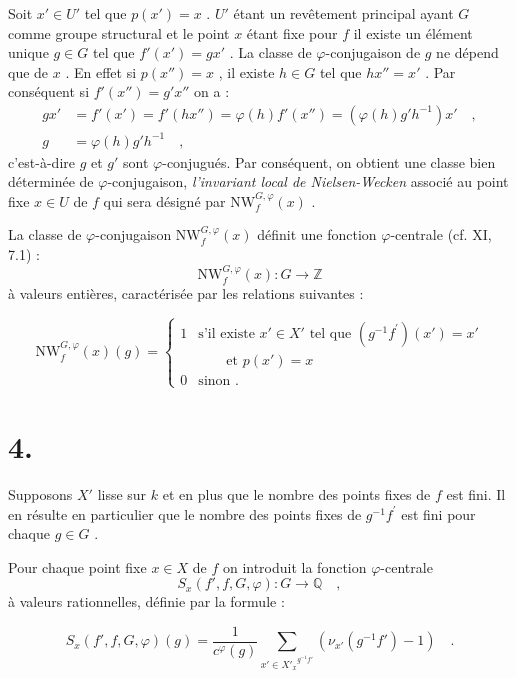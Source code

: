 \documentclass[11pt]{article}
\providecommand{\bZ}{\mathbb Z}
\providecommand{\bQ}{\mathbb Q}
\begin{document}
Soit $x' \in U'$ tel que $p(x') = x$ . $U'$ étant un revêtement principal ayant $G$ comme groupe structural et le point $x$ étant fixe pour $f$ il existe un élément unique $g \in G$ tel que $f'(x') = gx'$ . La classe de $\varphi$-conjugaison de $g$ ne dépend que de $x$ . En effet si $p(x'') = x$ , il existe $h \in G$ tel que $hx'' = x'$ . Par conséquent si $f'(x'') = g'x''$ on a :
\begin{align*}
gx' &= f'(x') = f'(hx'') = \varphi(h)f'(x'') = (\varphi(h)g'h^{-1})x' \quad , \\
g &= \varphi(h)g'h^{-1} \quad ,
\end{align*}
c'est-à-dire $g$ et $g'$ sont $\varphi$-conjugués. Par conséquent, on obtient une classe bien déterminée de $\varphi$-conjugaison, \emph{l'invariant local de Nielsen-Wecken} associé au point fixe $x \in U$ de $f$ qui sera désigné par $\mathrm{NW}_{f}^{G,\varphi}(x)$ .

La classe de $\varphi$-conjugaison $\mathrm{NW}_{f}^{G,\varphi}(x)$ définit une fonction $\varphi$-centrale (cf. XI, 7.1) :
\[
\mathrm{NW}_{f}^{G,\varphi}(x) : G \longrightarrow \bZ
\]
à valeurs entières, caractérisée par les relations suivantes :

\begin{equation}\tag{3.1}
\mathrm{NW}_{f}^{G,\varphi}(x)(g) = \begin{cases} 1 &
\text{s'il existe } x' \in X' \text{ tel que } (g^{-1}f^{\prime})(x') = x' \\ & \qquad \text{et } p(x') = x \\ 0 & \text{sinon .} \end{cases}
\end{equation}

\section*{4.}

Supposons $X'$ lisse sur $k$ et en plus que le nombre des points fixes de $f$ est fini. Il en résulte en particulier que le nombre des points fixes de $g^{-1}f^{\prime}$ est fini pour chaque $g \in G$ .

Pour chaque point fixe $x \in X$ de $f$ on introduit la fonction $\varphi$-centrale
\[
S_x(f',f,G,\varphi) : G \longrightarrow \bQ \quad ,
\]
à valeurs rationnelles, définie par la formule :

\begin{equation}\tag{4.1}
S_x(f',f,G,\varphi)(g) = \frac{1}{c^\varphi(g)} \sum_{x' \in {X'_x}^{g^{-1}f'}} (\nu_{x'}(g^{-1}f') - 1) \quad .
\end{equation}
\end{document}
